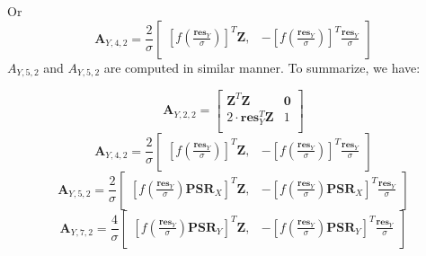 \documentclass[]{article}
\begin{document}
Or
\[
\pmb{A}_{Y,4,2} = \frac{2}{\sigma}\begin{bmatrix}
   \left[f\left(\frac{\pmb{res}_Y}{\sigma}\right)\right]^T \pmb{Z}, &
   -\left[f\left(\frac{\pmb{res}_Y}{\sigma}\right)\right]^T \frac{\pmb{res}_Y}{\sigma} \\
\end{bmatrix}
\]
$A_{Y,5,2}$ and  $A_{Y,5,2}$ are computed in similar manner. To summarize, we have:

\[
\pmb{A}_{Y,2,2} = 
\begin{bmatrix}
  \pmb{Z}^T\pmb{Z} & \pmb{0}\\
  2 \cdot \pmb{res}_Y^T\pmb{Z} & 1\\
  \end{bmatrix}
\]
\[
\pmb{A}_{Y,4,2} = \frac{2}{\sigma}\begin{bmatrix}
   \left[f\left(\frac{\pmb{res}_Y}{\sigma}\right)\right]^T \pmb{Z}, &
   -\left[f\left(\frac{\pmb{res}_Y}{\sigma}\right)\right]^T \frac{\pmb{res}_Y}{\sigma} \\
\end{bmatrix}
\]
\[
\pmb{A}_{Y,5,2} = \frac{2}{\sigma}\begin{bmatrix}
   \left[f\left(\frac{\pmb{res}_Y}{\sigma}\right)\pmb{PSR}_X\right]^T \pmb{Z}, &
   -\left[f\left(\frac{\pmb{res}_Y}{\sigma}\right)\pmb{PSR}_X\right]^T \frac{\pmb{res}_Y}{\sigma} \\
\end{bmatrix}
\]
\[
\pmb{A}_{Y,7,2} = \frac{4}{\sigma}\begin{bmatrix}
   \left[f\left(\frac{\pmb{res}_Y}{\sigma}\right)\pmb{PSR}_Y\right]^T \pmb{Z}, &
   -\left[f\left(\frac{\pmb{res}_Y}{\sigma}\right)\pmb{PSR}_Y\right]^T \frac{\pmb{res}_Y}{\sigma} \\
\end{bmatrix}
\]
\end{document}
